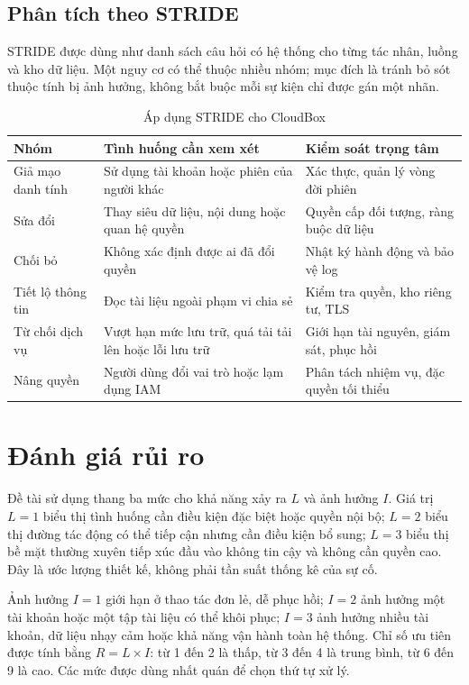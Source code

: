 \subsection{Phân tích theo STRIDE}
STRIDE được dùng như danh sách câu hỏi có hệ thống cho từng tác nhân, luồng và kho dữ liệu. Một nguy cơ có thể thuộc nhiều nhóm; mục đích là tránh bỏ sót thuộc tính bị ảnh hưởng, không bắt buộc mỗi sự kiện chỉ được gán một nhãn.
\begin{table}[htbp]\centering\small
\caption{Áp dụng STRIDE cho CloudBox}
\begin{tabularx}{\textwidth}{P{3cm}XX}\toprule
\textbf{Nhóm} & \textbf{Tình huống cần xem xét} & \textbf{Kiểm soát trọng tâm}\\\midrule
Giả mạo danh tính & Sử dụng tài khoản hoặc phiên của người khác & Xác thực, quản lý vòng đời phiên\\
Sửa đổi & Thay siêu dữ liệu, nội dung hoặc quan hệ quyền & Quyền cấp đối tượng, ràng buộc dữ liệu\\
Chối bỏ & Không xác định được ai đã đổi quyền & Nhật ký hành động và bảo vệ log\\
Tiết lộ thông tin & Đọc tài liệu ngoài phạm vi chia sẻ & Kiểm tra quyền, kho riêng tư, TLS\\
Từ chối dịch vụ & Vượt hạn mức lưu trữ, quá tải tải lên hoặc lỗi lưu trữ & Giới hạn tài nguyên, giám sát, phục hồi\\
Nâng quyền & Người dùng đổi vai trò hoặc lạm dụng IAM & Phân tách nhiệm vụ, đặc quyền tối thiểu\\\bottomrule
\end{tabularx}\end{table}

\section{Đánh giá rủi ro}
Đề tài sử dụng thang ba mức cho khả năng xảy ra $L$ và ảnh hưởng $I$. Giá trị $L=1$ biểu thị tình huống cần điều kiện đặc biệt hoặc quyền nội bộ; $L=2$ biểu thị đường tác động có thể tiếp cận nhưng cần điều kiện bổ sung; $L=3$ biểu thị bề mặt thường xuyên tiếp xúc đầu vào không tin cậy và không cần quyền cao. Đây là ước lượng thiết kế, không phải tần suất thống kê của sự cố.

Ảnh hưởng $I=1$ giới hạn ở thao tác đơn lẻ, dễ phục hồi; $I=2$ ảnh hưởng một tài khoản hoặc một tập tài liệu có thể khôi phục; $I=3$ ảnh hưởng nhiều tài khoản, dữ liệu nhạy cảm hoặc khả năng vận hành toàn hệ thống. Chỉ số ưu tiên được tính bằng $R=L\times I$: từ 1 đến 2 là thấp, từ 3 đến 4 là trung bình, từ 6 đến 9 là cao. Các mức được dùng nhất quán để chọn thứ tự xử lý.


